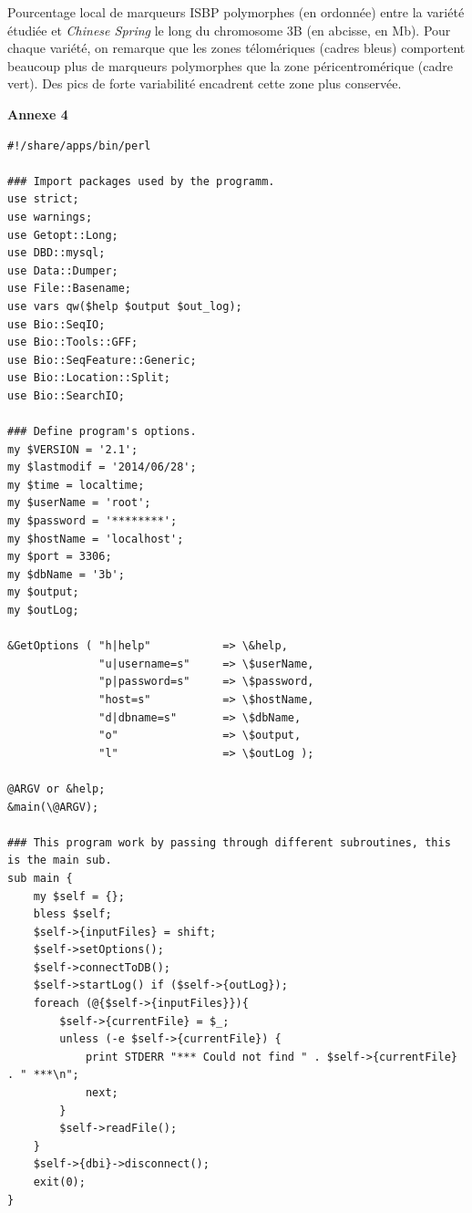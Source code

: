 \documentclass[a4paper, 12pt]{article}
\begin{document}
\begin{onehalfspace}
Pourcentage local de marqueurs ISBP polymorphes (en ordonnée) entre la variété étudiée et  \textit{Chinese Spring} le long du chromosome 3B (en abcisse, en Mb). Pour chaque variété, on remarque que les zones télomériques (cadres bleus) comportent beaucoup plus de marqueurs polymorphes que la zone péricentromérique (cadre vert). Des pics de forte variabilité encadrent cette zone plus conservée.\\

\newpage
\thispagestyle{empty}

\begin{center}
\Large\textbf{Annexe 4}\\
\end{center}

\begin{lstlisting}[frame=single]
#!/share/apps/bin/perl

### Import packages used by the programm.
use strict;
use warnings;
use Getopt::Long;
use DBD::mysql;
use Data::Dumper;
use File::Basename;
use vars qw($help $output $out_log);
use Bio::SeqIO;
use Bio::Tools::GFF;
use Bio::SeqFeature::Generic;
use Bio::Location::Split;
use Bio::SearchIO;

### Define program's options.
my $VERSION = '2.1';
my $lastmodif = '2014/06/28';
my $time = localtime;
my $userName = 'root';
my $password = '********';
my $hostName = 'localhost';
my $port = 3306;
my $dbName = '3b';
my $output;
my $outLog;

&GetOptions ( "h|help"           => \&help,
              "u|username=s"     => \$userName,
              "p|password=s"     => \$password,
              "host=s"           => \$hostName,
              "d|dbname=s"       => \$dbName,
              "o"                => \$output,
              "l"                => \$outLog );

@ARGV or &help;
&main(\@ARGV);

### This program work by passing through different subroutines, this is the main sub.
sub main {
	my $self = {};
	bless $self;
	$self->{inputFiles} = shift;
	$self->setOptions();
	$self->connectToDB();
	$self->startLog() if ($self->{outLog});
	foreach (@{$self->{inputFiles}}){
		$self->{currentFile} = $_;
		unless (-e $self->{currentFile}) {
			print STDERR "*** Could not find " . $self->{currentFile} . " ***\n";
			next;
		}
		$self->readFile();
	}
	$self->{dbi}->disconnect();
	exit(0);
}


\end{lstlisting}
\end{onehalfspace}
\end{document}
